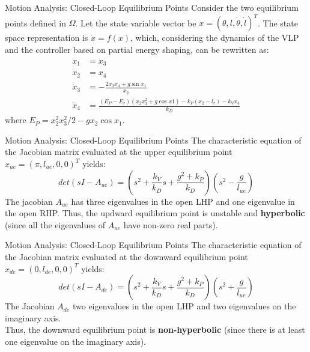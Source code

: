 \documentclass[10pt]{beamer}
\begin{document}
  \begin{frame}{Motion Analysis: Closed-Loop Equilibrium Points}
    Consider the two equilibrium points defined in $\Omega$.
    Let the state variable vector be $x = (\theta, l, \dot{\theta},
    \dot{l})^T$. The state space representation is $\dot{x} = f(x)$,
    which, considering the dynamics of the VLP and the controller based on
    partial energy shaping, can be rewritten as: 
    \begin{align*}
      \dot{x}_1 &= x_3 \\
      \dot{x}_2 &= x_4 \\
      \dot{x}_3 &= -\frac{2 x_3 x_4 + g\sin x_1}{x_2} \\
      \dot{x}_4 &= \frac{(E_P-E_r)(x_2 x_3^2 + g\cos x1)
        -k_P(x_2-l_r)-k_V x_4}{k_D}
    \end{align*}
    where $E_P=x_2^2 x_3^2 / 2 - g x_2 \cos x_1$.
  \end{frame}

  \begin{frame}{Motion Analysis: Closed-Loop Equilibrium Points}
    The characteristic equation of the Jacobian matrix evaluated
    at the upper equilibrium point $x_{ue} = (\pi, l_{ue}, 0, 0)^T$
    yields:
    \begin{equation*}
      det(sI-A_{ue}) = \left( s^2 + \frac{k_V}{k_D}s +
        \frac{g^2+k_P}{k_D} \right) \left( s^2 - \frac{g}{l_{ue}}\right)
    \end{equation*}
    The jacobian $A_{ue}$ has three eigenvalues in the open LHP and
    one eigenvalue in the open RHP. Thus, the updward equilibrium point
    is unstable and \textbf{hyperbolic} (since all the eigenvalues of $A_{ue}$
    have non-zero real parts).
  \end{frame}

  \begin{frame}{Motion Analysis: Closed-Loop Equilibrium Points}
    The characteristic equation of the Jacobian matrix evaluated
    at the downward equilibrium point $x_{de} = (0, l_{de}, 0, 0)^T$ yields:
    \begin{equation*}
      det(sI-A_{de}) = \left( s^2 + \frac{k_V}{k_D}s +
        \frac{g^2+k_P}{k_D} \right) \left( s^2 + \frac{g}{l_{ue}}\right)
    \end{equation*}
    The Jacobian $A_{de}$ two eigenvalues in the open LHP and two
    eigenvalues on the imaginary axis.\\Thus, the downward equilibrium
    point is \textbf{non-hyperbolic} (since there
    is at least one eigenvalue on the imaginary axis).
  \end{frame}
\end{document}
